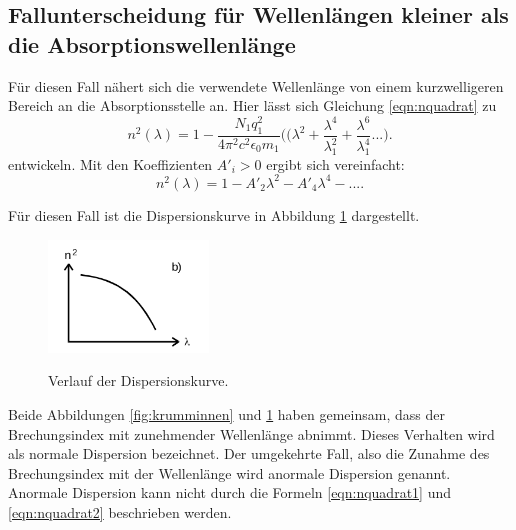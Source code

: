 \subsection{Fallunterscheidung für Wellenlängen kleiner als die Absorptionswellenlänge}%
Für diesen Fall nähert sich die verwendete Wellenlänge von einem kurzwelligeren
Bereich an die Absorptionsstelle an. Hier lässt sich Gleichung
\ref{eqn:nquadrat} zu
\begin{equation}
  n^2(\lambda)=1-\frac{N_1 q^{2}_1}{4\pi^2c^2\epsilon_0 m_1}
  \Bigr(\Bigr(\lambda^2+\frac{\lambda^4}{\lambda^{2}_1}+\frac{\lambda^6}{\lambda^{4}_1}...).
  \label{eqn:nquadratpotenz2}
\end{equation}
entwickeln. Mit den Koeffizienten $A'_i>0$ ergibt sich vereinfacht:
\begin{equation}
  n^2(\lambda)=1-A'_2 \lambda^2 -A'_4 \lambda^4-....
  \label{eqn:nquadrat2}
\end{equation}

Für diesen Fall ist die Dispersionskurve in Abbildung \ref{fig:krummaußen}
dargestellt.

\begin{figure}[H]
  \centering
  \includegraphics[height=3cm]{n2.png}
  \caption{Verlauf der Dispersionskurve.}
  \label{fig:krummaußen}
  \cite{skript}
\end{figure}


Beide Abbildungen \ref{fig:krumminnen} und \ref{fig:krummaußen} haben gemeinsam, dass
der Brechungsindex mit zunehmender Wellenlänge abnimmt. Dieses Verhalten wird als
normale Dispersion bezeichnet. Der umgekehrte Fall, also die Zunahme des
Brechungsindex mit der Wellenlänge wird anormale Dispersion genannt.
Anormale Dispersion kann nicht durch die Formeln \ref{eqn:nquadrat1} und
\ref{eqn:nquadrat2} beschrieben werden.

